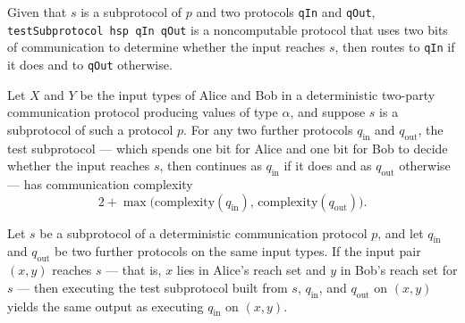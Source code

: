 \begin{definition}
\label{CommunicationComplexity.Deterministic.Protocol.testSubprotocol}
\leanok
{}
Given that $s$ is a subprotocol of $p$ and two protocols \texttt{qIn} and \texttt{qOut},
\texttt{testSubprotocol hsp qIn qOut} is a noncomputable protocol that uses two bits of
communication to determine whether the input reaches $s$, then routes to \texttt{qIn} if it
does and to \texttt{qOut} otherwise.
\end{definition}

\begin{lemma}
\label{CommunicationComplexity.Deterministic.Protocol.testSubprotocol_complexity}
\leanok
{}
Let $X$ and $Y$ be the input types of Alice and Bob in a deterministic two-party
communication protocol producing values of type $\alpha$, and suppose $s$ is a
subprotocol of such a protocol $p$. For any two further protocols $q_{\mathrm{in}}$ and
$q_{\mathrm{out}}$, the test subprotocol — which spends one bit for Alice and one bit
for Bob to decide whether the input reaches $s$, then continues as $q_{\mathrm{in}}$ if
it does and as $q_{\mathrm{out}}$ otherwise — has communication complexity \[ 2 +
\max\bigl(\mathrm{complexity}(q_{\mathrm{in}}),\,
\mathrm{complexity}(q_{\mathrm{out}})\bigr). \]
\end{lemma}

\begin{lemma}
\label{CommunicationComplexity.Deterministic.Protocol.testSubprotocol_run_inside}
\leanok
{}
Let $s$ be a subprotocol of a deterministic communication protocol $p$, and let
$q_{\mathrm{in}}$ and $q_{\mathrm{out}}$ be two further protocols on the same input
types. If the input pair $(x,y)$ reaches $s$ — that is, $x$ lies in Alice's reach set
and $y$ in Bob's reach set for $s$ — then executing the test subprotocol built from $s$,
$q_{\mathrm{in}}$, and $q_{\mathrm{out}}$ on $(x,y)$ yields the same output as executing
$q_{\mathrm{in}}$ on $(x,y)$.
\end{lemma}

